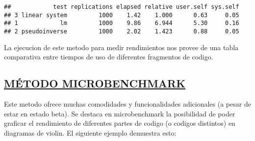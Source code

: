 \documentclass[preprint, 3p,
authoryear]{elsarticle} %
\begin{document}
\begin{verbatim}
##            test replications elapsed relative user.self sys.self
## 3 linear system         1000    1.42    1.000      0.63     0.05
## 1            lm         1000    9.86    6.944      5.30     0.16
## 2 pseudoinverse         1000    2.02    1.423      0.88     0.05
\end{verbatim}

La ejecucion de este metodo para medir rendimientos nos provee de una
tabla comparativa entre tiempos de uso de diferentes fragmentos de
codigo.

\hypertarget{muxe9todo-microbenchmark}{%
\subsection{\texorpdfstring{\uline{\textbf{MÉTODO
MICROBENCHMARK}}}{MÉTODO MICROBENCHMARK}}\label{muxe9todo-microbenchmark}}

Este metodo ofrece muchas comodidades y funcionalidades adicionales (a
pesar de estar en estado beta). Se destaca en microbenchmark la
posibilidad de poder graficar el rendimiento de diferentes partes de
codigo (o codigos distintos) en diagramas de violin. El siguiente
ejemplo demuestra esto:
\end{document}
